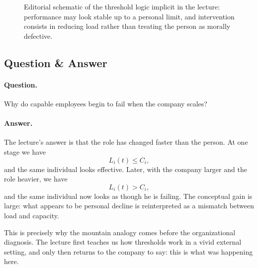 \begin{figure}
\centering
{}
\caption{Editorial schematic of the threshold logic implicit in the lecture: performance may look stable up to a personal limit, and intervention consists in reducing load rather than treating the person as morally defective.}
\end{figure}

\subsection{Question \& Answer}

\paragraph{Question.} Why do capable employees begin to fail when the company scales?

\paragraph{Answer.} The lecture's answer is that the role has changed faster than the person. At one stage we have
\begin{equation}
L_i(t) \le C_i,
\end{equation}
and the same individual looks effective. Later, with the company larger and the role heavier, we have
\begin{equation}
L_i(t) > C_i,
\end{equation}
and the same individual now looks as though he is failing. The conceptual gain is large: what appears to be personal decline is reinterpreted as a mismatch between load and capacity.

This is precisely why the mountain analogy comes before the organizational diagnosis. The lecture first teaches us how thresholds work in a vivid external setting, and only then returns to the company to say: this is what was happening here.

